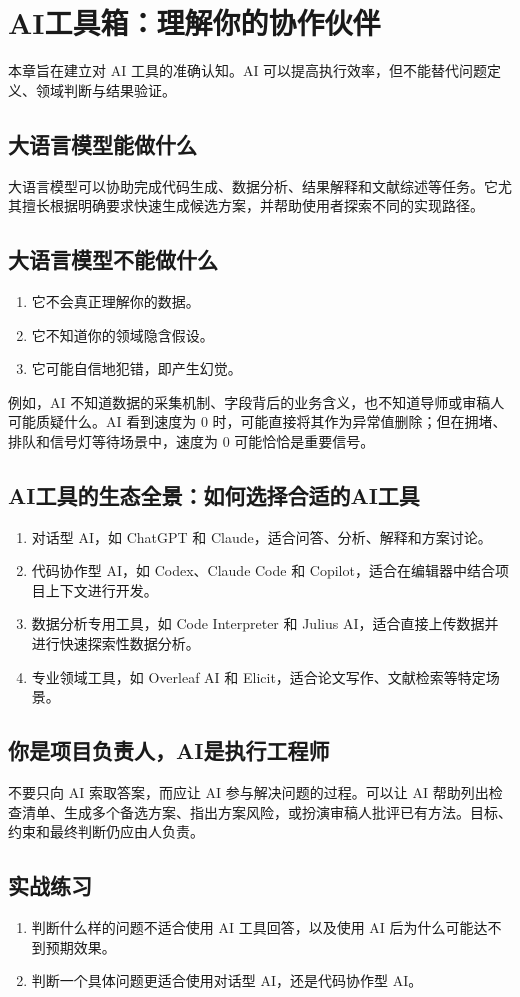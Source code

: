 \chapter{AI工具箱：理解你的协作伙伴}

本章旨在建立对 AI 工具的准确认知。AI 可以提高执行效率，但不能替代问题定义、领域判断与结果验证。

\section{大语言模型能做什么}

大语言模型可以协助完成代码生成、数据分析、结果解释和文献综述等任务。它尤其擅长根据明确要求快速生成候选方案，并帮助使用者探索不同的实现路径。

\section{大语言模型不能做什么}

\begin{enumerate}
  \item 它不会真正理解你的数据。
  \item 它不知道你的领域隐含假设。
  \item 它可能自信地犯错，即产生幻觉。
\end{enumerate}

例如，AI 不知道数据的采集机制、字段背后的业务含义，也不知道导师或审稿人可能质疑什么。AI 看到速度为 0 时，可能直接将其作为异常值删除；但在拥堵、排队和信号灯等待场景中，速度为 0 可能恰恰是重要信号。

\section{AI工具的生态全景：如何选择合适的AI工具}

\begin{enumerate}
  \item 对话型 AI，如 ChatGPT 和 Claude，适合问答、分析、解释和方案讨论。
  \item 代码协作型 AI，如 Codex、Claude Code 和 Copilot，适合在编辑器中结合项目上下文进行开发。
  \item 数据分析专用工具，如 Code Interpreter 和 Julius AI，适合直接上传数据并进行快速探索性数据分析。
  \item 专业领域工具，如 Overleaf AI 和 Elicit，适合论文写作、文献检索等特定场景。
\end{enumerate}

\section{你是项目负责人，AI是执行工程师}

不要只向 AI 索取答案，而应让 AI 参与解决问题的过程。可以让 AI 帮助列出检查清单、生成多个备选方案、指出方案风险，或扮演审稿人批评已有方法。目标、约束和最终判断仍应由人负责。

\section{实战练习}

\begin{enumerate}
  \item 判断什么样的问题不适合使用 AI 工具回答，以及使用 AI 后为什么可能达不到预期效果。
  \item 判断一个具体问题更适合使用对话型 AI，还是代码协作型 AI。
\end{enumerate}
